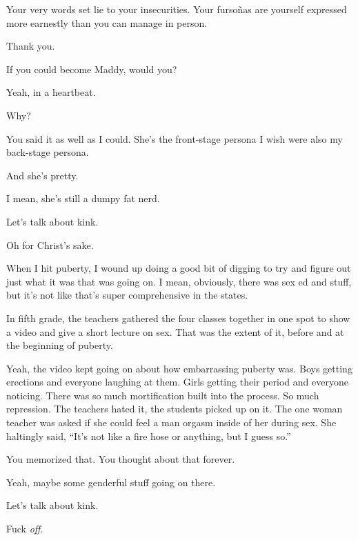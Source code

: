 \begin{leftcolumn}
\begin{ally}
Your very words set lie to your insecurities. Your fursoñas are yourself expressed more earnestly than you can manage in person.
\end{ally}
Thank you.

\begin{ally}
If you could become Maddy, would you?
\end{ally}
Yeah, in a heartbeat.

\begin{ally}
Why?
\end{ally}
You said it as well as I could. She's the front-stage persona I wish were also my back-stage persona.

\begin{ally}
And she's pretty.
\end{ally}
I mean, she's still a dumpy fat nerd.

\begin{ally}
Let's talk about kink.
\end{ally}
Oh for Christ's sake.
\newpage

\noindent When I hit puberty, I wound up doing a good bit of digging to try and figure out just what it was that was going on. I mean, obviously, there was sex ed and stuff, but it's not like that's super comprehensive in the states.

\begin{ally}
In fifth grade, the teachers gathered the four classes together in one spot to show a video and give a short lecture on sex. That was the extent of it, before and at the beginning of puberty.
\end{ally}
Yeah, the video kept going on about how embarrassing puberty was. Boys getting erections and everyone laughing at them. Girls getting their period and everyone noticing. There was so much mortification built into the process. So much repression. The teachers hated it, the students picked up on it. The one woman teacher was asked if she could feel a man orgasm inside of her during sex. She haltingly said, ``It's not like a fire hose or anything, but I guess so.''

\begin{ally}
You memorized that. You thought about that forever.
\end{ally}
Yeah, maybe some genderful stuff going on there.

\begin{ally}
Let's talk about kink.
\end{ally}
Fuck \emph{off}.


\end{leftcolumn}
